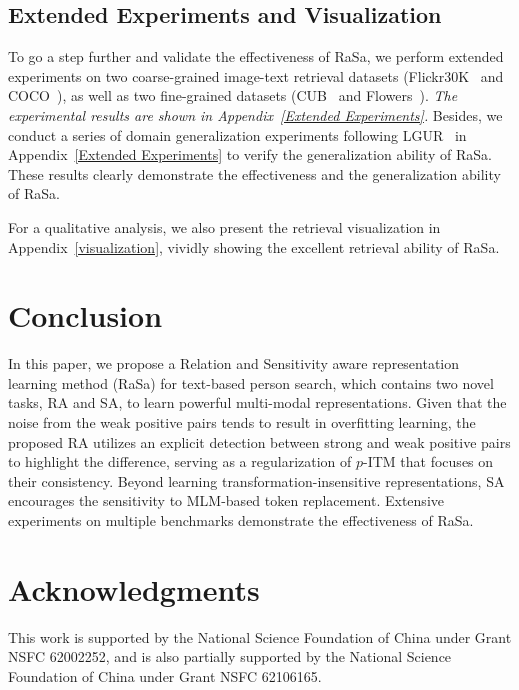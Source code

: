 \documentclass{article}
\begin{document}
\subsection{Extended Experiments and Visualization}





To go a step further and validate the effectiveness of RaSa, we perform extended experiments on two coarse-grained image-text retrieval datasets (Flickr30K~\cite{plummer2015flickr30k} and COCO~\cite{lin2014microsoft}), as well as two fine-grained datasets (CUB~\cite{reed2016learning} and Flowers~\cite{reed2016learning}). 
\emph{The experimental results are shown in Appendix~\ref{Extended Experiments}.}
Besides, we conduct a series of domain generalization experiments following LGUR~\cite{shao2022learning} in Appendix~\ref{Extended Experiments} to verify the generalization ability of RaSa. These results clearly demonstrate the effectiveness and the generalization ability of RaSa. 

For a qualitative analysis, we also present the retrieval visualization in Appendix~\ref{visualization}, vividly showing the excellent retrieval ability of RaSa.



\section{Conclusion}
In this paper, we propose a Relation and Sensitivity aware representation learning method (RaSa) for text-based person search, which contains two novel tasks, RA and SA, to learn powerful multi-modal representations. 
Given that the noise from the weak positive pairs tends to result in overfitting learning, the proposed RA utilizes an explicit detection between strong and weak positive pairs to highlight the difference, serving as a regularization of $p$-ITM that focuses on their consistency. 
Beyond learning transformation-insensitive representations, SA encourages the sensitivity to MLM-based token replacement.
Extensive experiments on multiple benchmarks demonstrate the effectiveness of RaSa.



\section*{Acknowledgments}
This work is supported by the National Science Foundation of China under Grant NSFC 62002252, and is also partially supported by the National Science Foundation of China under Grant NSFC 62106165.
\end{document}
